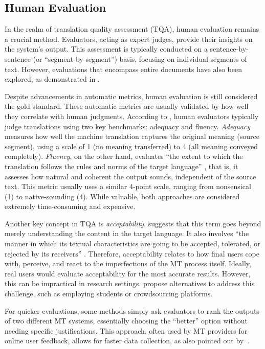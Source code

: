 {{\subsection{Human Evaluation}

In the realm of translation quality assessment (TQA), human evaluation remains a crucial method. Evaluators, acting as expert judges, provide their insights on the system's output. This assessment is typically conducted on a sentence-by-sentence (or ``segment-by-segment'') basis, focusing on individual segments of text. However, evaluations that encompass entire documents have also been explored, as demonstrated in \textcite{castilho-2020-page}.

Despite advancements in automatic metrics, human evaluation is still considered the gold standard. These automatic metrics are usually validated by how well they correlate with human judgments. According to \textcite{Rossi2022}, human evaluators typically judge translations using two key benchmarks: adequacy and fluency. \emph{Adequacy} measures how well the machine translation captures the original meaning (source segment), using a scale of 1 (no meaning transferred) to 4 (all meaning conveyed completely). \emph{Fluency}, on the other hand, evaluates ``the extent to which the translation follows the rules and norms of the target language'' \parencite[18]{castilho-2020-page}, that is, it assesses how natural and coherent the output sounds, independent of the source text. This metric usually uses a similar 4-point scale, ranging from nonsensical (1) to native-sounding (4). While valuable, both approaches are considered extremely time-consuming and expensive.

Another key concept in TQA is \emph{acceptability}. \textcite{Roturier2006AnII} suggests that this term goes beyond merely understanding the content in the target language. It also involves ``the manner in which its textual characteristics are going to be accepted, tolerated, or rejected by its receivers'' \parencite[66]{Roturier2006AnII}. Therefore, acceptability relates to how final users cope with, perceive, and react to the imperfections of the MT process itself. Ideally, real users would evaluate acceptability for the most accurate results. However, this can be impractical in research settings. \textcite{Rossi2022} propose alternatives to address this challenge, such as employing students or crowdsourcing platforms.

For quicker evaluations, some methods simply ask evaluators to rank the outputs of two different MT systems, essentially choosing the ``better'' option without needing specific justifications. This approach, often used by MT providers for online user feedback, allows for faster data collection, as also pointed out by~\textcite{Rossi2022}.

}}
